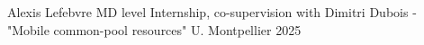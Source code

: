 


\begin{cvhonors}

  \cvhonor
    {Alexis Lefebvre} %
    {MD level Internship, co-supervision with Dimitri Dubois - "Mobile common-pool resources"} %
    {U. Montpellier} %
    {2025} %

\end{cvhonors}
